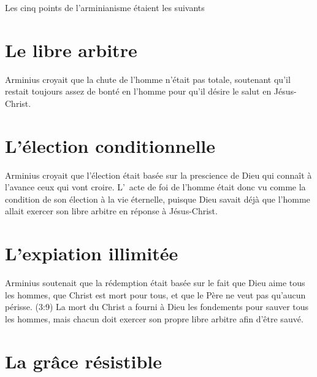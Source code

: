 
Les \Og cinq points de l'arminianisme \Fg{}
 étaient les suivants\frcolon
{}

\section*{Le libre arbitre}

\begin{pocketpar}{}
Arminius croyait que la chute de
 l'homme n'était pas totale,
 soute\-nant qu'il restait toujours assez de bonté en l'homme
 pour qu'il désire le salut en Jésus-Christ.
\end{pocketpar}

\section*{L'élection conditionnelle}

\begin{pocketpar}{}
Arminius croyait que l'élection
 était basée sur la prescience
 de Dieu qui connaît à l'avance ceux qui vont croire.
 L'~\Og acte de foi \Fg{} de l'homme était donc vu comme la \Og condition \Fg{} 
 de son élection à la vie éternelle, puisque Dieu savait déjà
 que l'homme allait exercer son \Og libre arbitre \Fg{}
 en réponse à Jésus-Christ.
\end{pocketpar}

\section*{L'expiation illimitée}

Arminius soutenait que la rédemption était basée sur le fait
 que Dieu aime tous les hom\-mes, que Christ est mort pour tous,
 et que le Père ne veut pas qu'aucun périsse.
 (3:9)
 La mort du Christ a fourni à Dieu les fondements
 pour sauver tous les
 hommes, mais chacun doit exercer son propre
 \Og libre arbitre \Fg{} afin
 d'être sauvé.

\section*{La grâce résistible}

